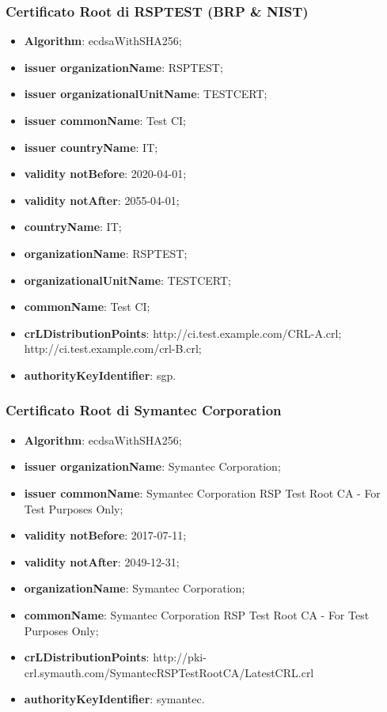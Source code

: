 \documentclass[10pt, oneside]{book}
\begin{document}
\subsubsection{Certificato Root di RSPTEST (BRP \& NIST)}
\begin{itemize}
\item \textbf{Algorithm}: ecdsaWithSHA256;
\item \textbf{issuer organizationName}: RSPTEST;
\item \textbf{issuer organizationalUnitName}: TESTCERT;
\item \textbf{issuer commonName}: Test CI;
\item \textbf{issuer countryName}: IT;
\item \textbf{validity notBefore}: 2020-04-01;
\item \textbf{validity notAfter}: 2055-04-01;
\item \textbf{countryName}: IT;
\item \textbf{organizationName}: RSPTEST;
\item \textbf{organizationalUnitName}: TESTCERT;
\item \textbf{commonName}: Test CI;
\item \textbf{crLDistributionPoints}: http://ci.test.example.com/CRL-A.crl;\\http://ci.test.example.com/crl-B.crl;
\item \textbf{authorityKeyIdentifier}: sgp.
\end{itemize}

\subsubsection{Certificato Root di Symantec Corporation}
\begin{itemize}
\item \textbf{Algorithm}: ecdsaWithSHA256;
\item \textbf{issuer organizationName}: Symantec Corporation;
\item \textbf{issuer commonName}: Symantec Corporation RSP Test Root CA - For Test Purposes Only;
\item \textbf{validity notBefore}: 2017-07-11;
\item \textbf{validity notAfter}: 2049-12-31;
\item \textbf{organizationName}: Symantec Corporation;
\item \textbf{commonName}: Symantec Corporation RSP Test Root CA - For Test Purposes Only;
\item \textbf{crLDistributionPoints}: http://pki-crl.symauth.com/SymantecRSPTestRootCA/LatestCRL.crl
\item \textbf{authorityKeyIdentifier}: symantec.
\end{itemize}
\end{document}
